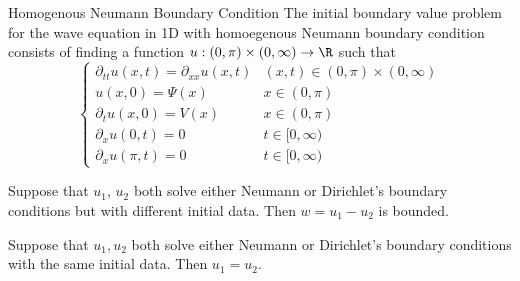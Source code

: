 \documentclass[a4paper]{article}
\begin{document}
\begin{defn}{Homogenous Neumann Boundary Condition}{} The initial boundary value problem for the wave equation in 1D with homoegenous Neumann boundary condition consists of finding a function $u:(0,\pi)\times(0,\infty)\to\R$ such that $$\begin{cases}
\partial_{tt}u(x,t)=\partial_{xx}u(x,t) & (x,t)\in(0,\pi)\times(0,\infty)\\
u(x,0)=\Psi(x) & x\in(0,\pi)\\
\partial_tu(x,0)=V(x) & x\in(0,\pi)\\
\partial_xu(0,t)=0 & t\in[0,\infty)\\
\partial_xu(\pi,t)=0 & t\in[0,\infty)
\end{cases}$$
\end{defn}

\begin{prp}{}{} Suppose that $u_1$, $u_2$ both solve either Neumann or Dirichlet's boundary conditions but with different initial data. Then $w=u_1-u_2$ is bounded. 
\end{prp}

\begin{lmm}{}{} Suppose that $u_1,u_2$ both solve either Neumann or Dirichlet's boundary conditions with the same initial data. Then $u_1=u_2$. 
\end{lmm}
\end{document}
